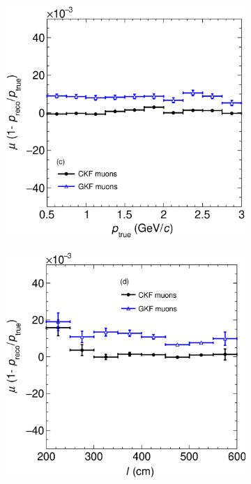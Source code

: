 \begin{figure}[t]
\begin{subfigure}{0.38\textwidth}
         \caption{}
         \label{fig:pResVSL_PGun}
     \end{subfigure}
     \begin{subfigure}{0.38\textwidth}
         \centering
         \includegraphics[width=\textwidth]{figures/ch5-KF_NDGAr/FullSample/PGun/pRes/BiaspVSp_pgun.eps}
         \caption{}
         \label{fig:pBiasVSp_PGun}
     \end{subfigure}
     \begin{subfigure}{0.38\textwidth}
         \centering
         \includegraphics[width=\textwidth]{figures/ch5-KF_NDGAr/FullSample/PGun/pRes/BiaspVSLength_pgun.eps}
         \caption{}
         \label{fig:pBiasVSL_PGun}
     \end{subfigure}


\end{figure}
